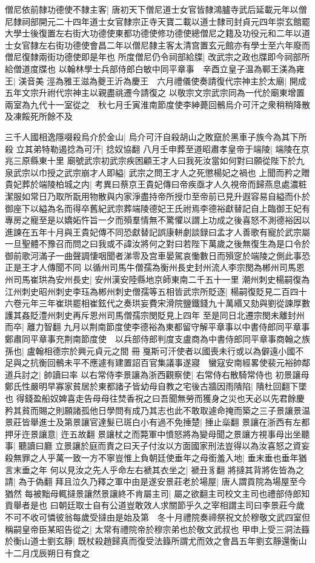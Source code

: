 僧尼依前隸功德使不隸主客|{
	唐初天下僧尼道士女官皆隸鴻臚寺武后延載元年以僧尼隸祠部開元二十四年道士女官隸宗正寺天寶二載以道士隸司封貞元四年崇玄館罷大學士後復置左右街大功德使東都功德使修功德使總僧尼之籍及功役元和二年以道士女官隸左右街功德使會昌二年以僧尼隸主客太清宫置玄元館亦有學士至六年廢而僧尼復隸兩街功德使即是年也}
所度僧尼仍令祠部給牒|{
	改武宗之政也牒即今祠部所給僧道度牒也}
以翰林學士兵部侍郎白敏中同平章事　辛酉立皇子温為鄆王渼為雍王|{
	渼音美}
涇為雅王滋為夔王沂為慶王　六月禮儀使奏請復代宗神主於太廟|{
	開成五年文宗升祔代宗神主以親盡祧遷今請復之}
以敬宗文宗武宗同為一代於廟東增置兩室為九代十一室從之　秋七月壬寅淮南節度使李紳薨回鶻烏介可汗之衆稍稍降散及凍餒死所餘不及

三千人國相逸隱啜殺烏介於金山|{
	烏介可汗自殺胡山之敗竄於黑車子族今為其下所殺}
立其弟特勒遏捻為可汗|{
	捻奴協翻}
八月壬申葬至道昭肅孝皇帝于端陵|{
	端陵在京兆三原縣東十里}
廟號武宗初武宗疾困顧王才人曰我死汝當如何對曰願從陛下於九泉武宗以巾授之武宗崩才人即縊|{
	武宗之問王才人之死懲楊妃之禍也}
上聞而矜之贈貴妃葬於端陵柏城之内|{
	考異曰蔡京王貴妃傳曰帝疾亟才人久視帝而歸燕息處濃粧潔服如常日乃取所翫用物散與内家淨盡持帝所授巾至帝前已見升遐容易自縊而仆於御座下以縊為名而得卒舊紀武宗葬端陵德妃王氏祔焉李德裕獻替記自上臨御王妃有專房之寵至是以嬌妬忤旨一夕而殞羣情無不驚懼以謂上功成之後喜怒不測德裕因以進諫在五年十月與王貴妃傳不同恐獻替記誤康軿劇談録曰孟才人善歌有寵於武宗屬一旦聖體不豫召而問之曰我或不諱汝將何之對曰若陛下萬歲之後無復生為是口令於御前歌河滿子一曲聲調悽咽聞者涕零及宫車晏駕哀慟數日而殞窆於端陵之側此事恐正是王才人傳聞不同}
以循州司馬牛僧孺為衡州長史封州流人李宗閔為郴州司馬恩州司馬崔珙為安州長史|{
	安州漢安陸縣地京師東南二千五十一里}
潮州刺史楊嗣復為江州刺史昭州刺史李珏為郴州刺史僧孺等五相皆武宗所貶逐|{
	楊嗣復貶見二百四十六卷元年三年崔珙罷相崔鉉代之奏珙妄費宋滑院鹽鐵錢九十萬緡又劾與劉從諫厚數護其姦貶澧州刺史再斥恩州司馬僧孺宗閔貶見上四年}
至是同日北遷宗閔未離封州而卒|{
	離力智翻}
九月以荆南節度使李德裕為東都留守解平章事以中書侍郎同平章事鄭肅同平章事充荆南節度使　以兵部侍郎判度支盧商為中書侍郎同平章事商翰之族孫也|{
	盧翰相德宗於興元貞元之間}
冊戛斯可汗使者以國喪未行或以為僻遠小國不足與之抗衡回鶻未平不應遽有建置詔百官集議事遂寢　蠻寇安南經畧使裴元裕帥鄰道兵討之|{
	帥讀曰率}
以右常侍李景讓為浙西觀察使|{
	右常侍右散騎常侍也}
初景讓母鄭氏性嚴明早寡家貧居於東都諸子皆幼母自教之宅後古牆因雨隤陷|{
	隤杜回翻下墜也}
得錢盈船奴婢喜走告母母往焚香祝之曰吾聞無勞而獲身之災也天必以先君餘慶矜其貧而賜之則願諸孤他日學問有成乃其志也此不敢取遽命掩而築之三子景讓景温景莊皆舉進士及第景讓官達髮已斑白小有過不免捶楚|{
	捶止橤翻}
景讓在浙西有左都押牙迕景讓意|{
	迕五故翻}
景讓杖之而斃軍中憤怒將為變母聞之景讓方視事母出坐聽事|{
	聽讀曰廳}
立景讓於庭而責之曰天子付汝以方面國家刑法豈得以為汝喜怒之資妄殺無罪之人乎萬一致一方不寧豈惟上負朝廷使垂年之母銜羞入地|{
	垂末垂也垂年猶言末垂之年}
何以見汝之先人乎命左右褫其衣坐之|{
	褫丑豸翻}
將撻其背將佐皆為之請|{
	為于偽翻}
拜且泣久乃釋之軍中由是遂安景莊老於場屋|{
	唐人謂貢院為場屋至今猶然}
每被黜母輒撻景讓然景讓終不肯屬主司|{
	屬之欲翻主司校文主司也禮部侍郎知貢舉者是也}
曰朝廷取士自有公道豈敢效人求關節乎久之宰相謂主司曰李景莊今歲不可不收可憐彼翁每歲受撻由是始及第　冬十月禮院奏禘祭祝文於穆敬文武四室但稱嗣皇帝臣某昭告從之|{
	太常有禮院帝於穆宗弟也於敬文武叔也}
甲申上受三洞法籙於衡山道士劉玄靜|{
	既杖殺趙歸真而復受法籙所謂尤而效之會昌五年劉玄靜還衡山}
十二月戊辰朔日有食之

